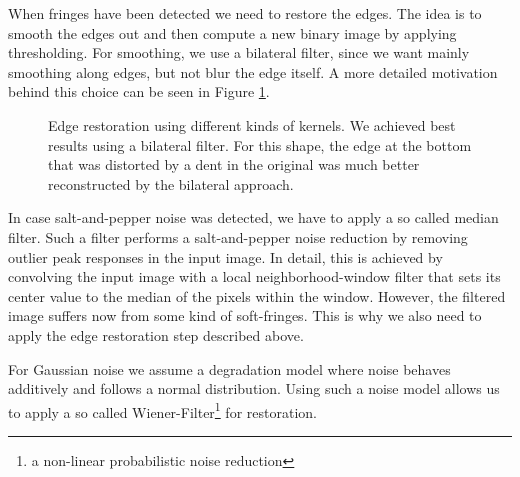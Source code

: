 \documentclass[conference]{IEEEtran}
\begin{document}
When fringes have been detected we need to restore the edges.
The idea is to smooth the edges out and then compute a new binary image by applying thresholding. 
For smoothing, we use a bilateral filter\cite{TomasiBilateralFiltering}, since we want mainly smoothing along edges, 
but not blur the edge itself. 
A more detailed motivation behind this
choice can be seen in Figure \ref{fig:bilateral_vs_gaussian_smoothed}. 
\begin{figure}[ht!]%
\centering
{}
\caption{Edge restoration using different kinds of kernels. We achieved best results
using a bilateral filter. For this shape, the edge at the bottom that was distorted by 
a dent in the original was much better reconstructed by the bilateral approach.}
\label{fig:bilateral_vs_gaussian_smoothed}
\end{figure}

In case salt-and-pepper noise was detected, we have to apply a so called median filter. 
Such a filter performs a salt-and-pepper noise reduction by removing outlier peak responses in the input image. 
In detail, this is achieved by convolving the input image with a local neighborhood-window filter that sets its center value to the median of the pixels within the window. 
However, the filtered image suffers now from some kind of soft-fringes. This is why we also need to apply the edge restoration step described above. 

For Gaussian noise we assume a degradation model where noise behaves additively and follows  a normal distribution. 
Using such a noise model allows us to apply a so called Wiener-Filter\footnote{a non-linear probabilistic noise reduction}\cite{Wiener:1964:EIS:1097023} for restoration. 
\end{document}
